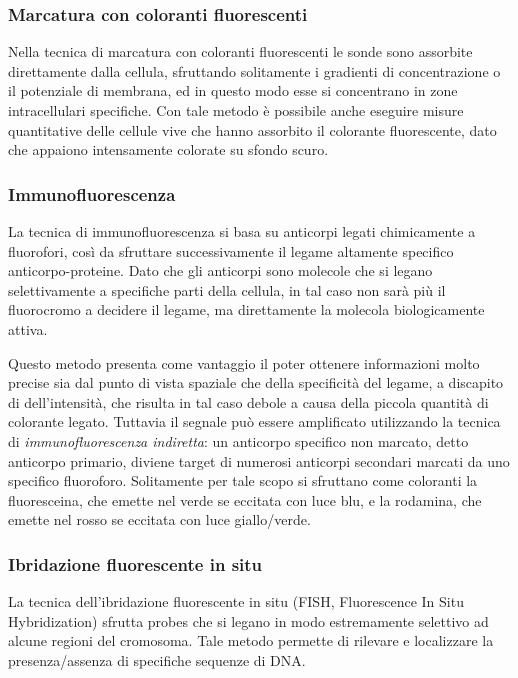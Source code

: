 \subsubsection{Marcatura con coloranti fluorescenti}
Nella tecnica di marcatura con coloranti fluorescenti le sonde sono assorbite direttamente dalla cellula, sfruttando solitamente i gradienti di concentrazione o il potenziale di membrana, ed in questo modo esse si concentrano in zone intracellulari specifiche.
Con tale metodo è possibile anche eseguire misure quantitative delle cellule vive che hanno assorbito il colorante fluorescente, dato che appaiono intensamente colorate su sfondo scuro. 

\subsubsection{Immunofluorescenza}
La tecnica di immunofluorescenza si basa su anticorpi legati chimicamente a fluorofori, così da sfruttare successivamente il legame altamente specifico anticorpo-proteine. 
Dato che gli anticorpi sono molecole che si legano selettivamente a specifiche parti della cellula, in tal caso non sarà più il fluorocromo a decidere il legame, ma direttamente la molecola biologicamente attiva.

Questo metodo presenta come vantaggio il poter ottenere informazioni molto precise sia dal punto di vista spaziale che della specificità del legame, a discapito di dell'intensità, che risulta in tal caso debole a causa della piccola quantità di colorante legato.
Tuttavia il segnale può essere amplificato utilizzando la tecnica di \textit{immunofluorescenza indiretta}: un anticorpo specifico non marcato, detto anticorpo primario, diviene target di numerosi anticorpi secondari marcati da uno specifico fluoroforo. 
Solitamente per tale scopo si sfruttano come coloranti la fluoresceina, che emette nel verde se eccitata con luce blu, e la rodamina, che emette nel rosso se eccitata con luce giallo/verde.

\subsubsection{Ibridazione fluorescente in situ}
La tecnica dell'ibridazione fluorescente in situ (FISH, Fluorescence In Situ Hybridization) sfrutta probes che si legano in modo estremamente selettivo ad alcune regioni del cromosoma. 
Tale metodo permette di rilevare e localizzare la presenza/assenza di specifiche sequenze di DNA.

